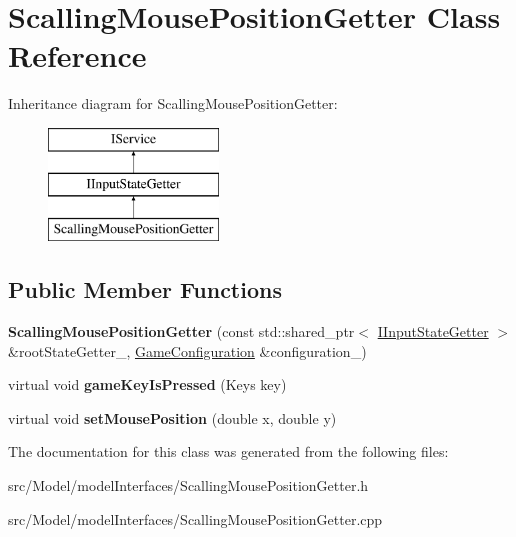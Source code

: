 \hypertarget{classScallingMousePositionGetter}{}\section{Scalling\+Mouse\+Position\+Getter Class Reference}
\label{classScallingMousePositionGetter}
Inheritance diagram for Scalling\+Mouse\+Position\+Getter\+:\begin{figure}[H]
\begin{center}
\leavevmode
\includegraphics[height=3.000000cm]{classScallingMousePositionGetter}
\end{center}
\end{figure}
\subsection*{Public Member Functions}
\begin{DoxyCompactItemize}
\item 
{\bfseries Scalling\+Mouse\+Position\+Getter} (const std\+::shared\+\_\+ptr$<$ \hyperlink{classIInputStateGetter}{I\+Input\+State\+Getter} $>$ \&root\+State\+Getter\+\_\+, \hyperlink{classGameConfiguration}{Game\+Configuration} \&configuration\+\_\+)\hypertarget{classScallingMousePositionGetter_a0b130e8fe82b7ab19fc1f0b4a7c24025}{}\label{classScallingMousePositionGetter_a0b130e8fe82b7ab19fc1f0b4a7c24025}

\item 
virtual void {\bfseries game\+Key\+Is\+Pressed} (Keys key)\hypertarget{classScallingMousePositionGetter_a784d853e5f9f046f307d329c68b4e15b}{}\label{classScallingMousePositionGetter_a784d853e5f9f046f307d329c68b4e15b}

\item 
virtual void {\bfseries set\+Mouse\+Position} (double x, double y)\hypertarget{classScallingMousePositionGetter_a6d37004d416fc9db92e035764cf90601}{}\label{classScallingMousePositionGetter_a6d37004d416fc9db92e035764cf90601}

\end{DoxyCompactItemize}


The documentation for this class was generated from the following files\+:\begin{DoxyCompactItemize}
\item 
src/\+Model/model\+Interfaces/Scalling\+Mouse\+Position\+Getter.\+h\item 
src/\+Model/model\+Interfaces/Scalling\+Mouse\+Position\+Getter.\+cpp\end{DoxyCompactItemize}
